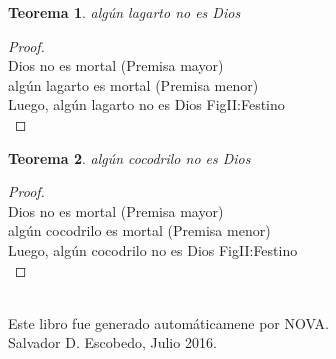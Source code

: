 ﻿\documentclass[12pt]{book}
\newtheorem{theorem}{Teorema}[chapter]
\newtheorem{proof}{Demostración}
\begin{document}
\begin{theorem}
algún lagarto no es Dios
\label{th: 127}
\end{theorem}\begin{proof}\\Dios no es mortal	 (Premisa mayor) \\algún lagarto es mortal	 (Premisa menor) \\Luego, algún lagarto no es Dios	FigII:Festino \\ \end{proof}
\begin{theorem}
algún cocodrilo no es Dios
\label{th: 128}
\end{theorem}\begin{proof}\\Dios no es mortal	 (Premisa mayor) \\algún cocodrilo es mortal	 (Premisa menor) \\Luego, algún cocodrilo no es Dios	FigII:Festino \\ \end{proof}
\\\small{Este libro fue generado automáticamene por NOVA.} \\
\small{Salvador D. Escobedo, Julio 2016}.
\end{document}
